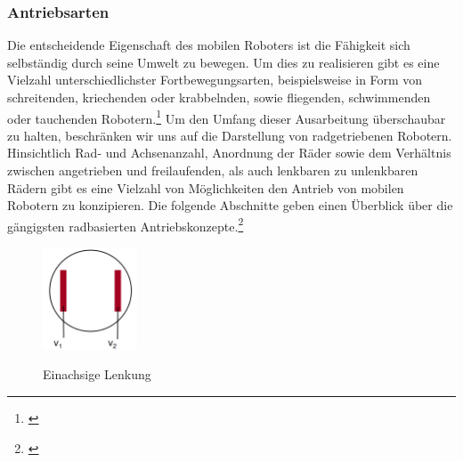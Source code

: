 \subsubsection{Antriebsarten}
Die entscheidende Eigenschaft des mobilen Roboters ist die Fähigkeit sich selbständig durch seine Umwelt zu bewegen. Um dies zu realisieren gibt es eine Vielzahl unterschiedlichster Fortbewegungsarten, beispielsweise in Form von schreitenden, kriechenden oder krabbelnden, sowie fliegenden, schwimmenden oder tauchenden Robotern.\footnote{\citep[vgl.][Mobile Roboter, Seite 103]{Hertzberg.MobileRoboter}\label{note20}}
\newline
Um den Umfang dieser Ausarbeitung überschaubar zu halten, beschränken wir uns auf die Darstellung von radgetriebenen Robotern.
\medskip
\newline
Hinsichtlich Rad- und Achsenanzahl, Anordnung der Räder sowie dem Verhältnis zwischen angetrieben und freilaufenden, als auch lenkbaren zu unlenkbaren Rädern gibt es eine Vielzahl von Möglichkeiten den Antrieb von mobilen Robotern zu konzipieren. Die folgende Abschnitte geben einen Überblick über die gängigsten radbasierten Antriebskonzepte.\footnote{\citep[vgl.][Mobile Roboter, Seite 107 f.]{Hertzberg.MobileRoboter}\label{note21}}
\begin{figure}
	\vspace{+0.5cm}
	\begin{center}
		\includegraphics[width=0.25\textwidth]{images/technische_grundlagen/Differentialantrieb.png}
	\end{center}
	\caption{Einachsige Lenkung}
	\cite{MarkusStrand.Robotikscript}
	\label{fig:einachsenlenkung}
\end{figure}
